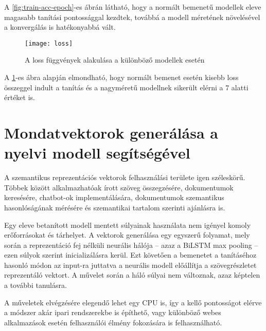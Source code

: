 A \ref{fig:train-acc-epoch}-es ábrán látható, hogy a normált bemenetű modellek eleve magasabb tanítási pontossággal kezdtek, továbbá a modell méretének növelésével a konvergálás is hatékonyabbá vált.

\begin{figure}[H]
	\centering
	\texttt{[image: loss]}
	\caption{A loss függvények alakulása a különböző modellek esetén}
	\label{fig:train-loss-epoch}
\end{figure}

A \ref{fig:train-loss-epoch}-es ábra alapján elmondható, hogy normált bemenet esetén kisebb loss összeggel indult a tanítás és a nagyméretű modellnek sikerült elérni a 7 alatti értéket is. 


\section{Mondatvektorok generálása a nyelvi modell segítségével}

A szemantikus reprezentációs vektorok felhasználási területe igen széleskörű. Többek között alkalmazhatóak írott szöveg összegzésére, dokumentumok keresésére, chatbot-ok implementálására, dokumentumok szemantikus hasonlóságának mérésére és szemantikai tartalom szerinti ajánlásra is.

Egy eleve betanított modell mentett súlyainak használata nem igényel komoly erőforrásokat és tárhelyet. A vektorok generálása egy egyszerű folyamat, mely során a reprezentáció fej nélküli neurális hálója – azaz a BiLSTM max pooling – ezen súlyok szerint inicializálásra kerül. Ezt követően a bemenetet a tanításéhoz hasonló módon az input-ra juttatva a neurális modell előállítja a szövegrészletet reprezentáló vektort. A művelet során a háló súlyai nem változnak, azaz képtelen a további tanulásra.

A műveletek elvégzésére elegendő lehet egy CPU is, így a kellő pontosságot elérve a módszer akár ipari rendszerekbe is építhető, vagy különböző webes alkalmazások esetén felhasználói élmény fokozására is felhasználható.